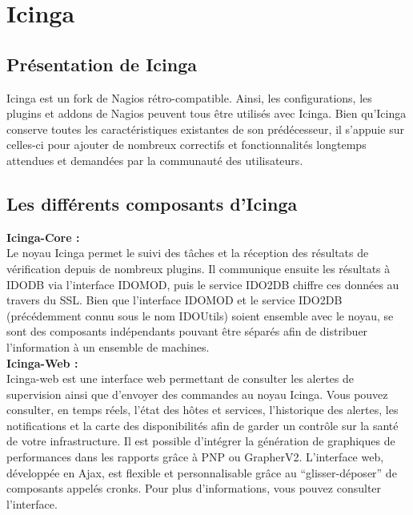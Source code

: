 \section{Icinga}
	\subsection{Présentation de Icinga}
		\vspace{0.3cm}
		
		Icinga est un fork de Nagios rétro-compatible. Ainsi, les configurations, les plugins et addons de Nagios peuvent tous être utilisés avec Icinga. Bien qu'Icinga conserve toutes les caractéristiques existantes de son prédécesseur, il s'appuie sur celles-ci pour ajouter de nombreux correctifs et fonctionnalités longtemps attendues et demandées par la communauté des utilisateurs.
	
	\subsection{Les différents composants d'Icinga}
		\vspace{0.3cm}
		
		\textbf{Icinga-Core :}\\
		
		Le noyau Icinga permet le suivi des tâches et la réception des résultats de vérification depuis de nombreux plugins. Il communique ensuite les résultats à IDODB via l'interface IDOMOD, puis le service IDO2DB chiffre ces données au travers du SSL. Bien que l'interface IDOMOD et le service IDO2DB (précédemment connu sous le nom IDOUtils) soient ensemble avec le noyau, se sont des composants indépendants pouvant être séparés afin de distribuer l'information à un ensemble de machines.\\

		\textbf{Icinga-Web :}\\
		
		Icinga-web est une interface web permettant de consulter les alertes de supervision ainsi que d'envoyer des commandes au noyau Icinga. Vous pouvez consulter, en temps réels, l'état des hôtes et services, l'historique des alertes, les notifications et la carte des disponibilités afin de garder un contrôle sur la santé de votre infrastructure. Il est possible d'intégrer la génération de graphiques de performances dans les rapports grâce à PNP ou GrapherV2. L'interface web, développée en Ajax, est flexible et personnalisable grâce au “glisser-déposer” de composants appelés cronks. Pour plus d'informations, vous pouvez consulter l'interface.\\

